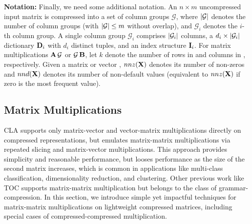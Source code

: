 \textbf{Notation:}
Finally, we need some additional notation.
An $n \times m$ uncompressed input matrix is compressed into a set of column groups $\mathcal{G}$, where $\lvert \mathcal{G}\rvert$ denotes the number
of column groups (with $\lvert \mathcal{G}\rvert \leq m$ without overlap), and $\mathcal{G}_i$ denotes the $i$-th column group.
A single column group $\mathcal{G}_i$ comprises $\lvert \mathcal{G}_i\rvert$ columns, a $d_i \times \lvert \mathcal{G}_i\rvert$ dictionary $\mathbf{D}_i$ with $d_i$ distinct tuples,
and an index structure $\mathbf{I}_i$. For matrix multiplications $\mathbf{A}\,\mathcal{G}$ or $\mathcal{G}\,\mathbf{B}$,
let $k$ denote the number of rows in  and columns in , respectively.
Given a matrix or vector , $nnz(\mathbf{X})$ denotes its number of non-zeros and $nnd(\mathbf{X})$ denotes its number of non-default values
(equivalent to $nnz(\mathbf{X})$ if zero is the most frequent value).


\subsection{Matrix Multiplications}

CLA supports only matrix-vector and vector-matrix multiplications directly on compressed representations,
but emulates matrix-matrix multiplications via repeated slicing and matrix-vector multiplications.
This approach provides simplicity and reasonable performance, but looses performance as the size of the second matrix increases,
which is common in applications like multi-class classification, dimensionality reduction, and clustering.
Other previous work like TOC \cite{LiCZ00NP19} supports matrix-matrix multiplication but belongs to the class of grammar-compression.
In this section, we introduce simple yet impactful techniques for matrix-matrix multiplications on lightweight compressed matrices,
including special cases of compressed-compressed multiplication.

